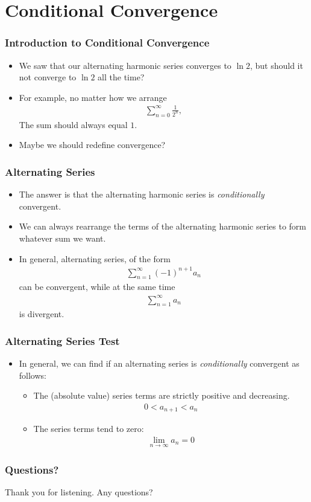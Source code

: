 \documentclass{beamer}
\begin{document}
\section{Conditional Convergence}
\begin{frame}
  \frametitle{Introduction to Conditional Convergence}
  \begin{itemize}
    \item<1-> We saw that our alternating harmonic series converges to $\ln 2$, but should it not converge to $\ln 2$ all the time?
    \item<2-> For example, no matter how we arrange
      \begin{align*}
        \sum_{n=0}^{\infty}\frac{1}{2^n},
      \end{align*}
      The sum should always equal $1$.
    \item<3-> Maybe we should redefine convergence?
  \end{itemize}
\end{frame}
\begin{frame}
  \frametitle{Alternating Series}
  \begin{itemize}
    \item<1-> The answer is that the alternating harmonic series is \textit{conditionally} convergent.
    \item<2-> We can always rearrange the terms of the alternating harmonic series to form whatever sum we want.
    \item<3-> In general, alternating series, of the form
      \begin{align*}
        \sum_{n=1}^{\infty}(-1)^{n+1}a_n
      \end{align*}
      can be convergent, while at the same time
      \begin{align*}
        \sum_{n=1}^{\infty} a_n
      \end{align*}
      is divergent.
  \end{itemize}
\end{frame}
\begin{frame}
  \frametitle{Alternating Series Test}
  \begin{itemize}
    \item<1-> In general, we can find if an alternating series is \textit{conditionally} convergent as follows:
    \begin{itemize}
      \item<2-> The (absolute value) series terms are strictly positive and decreasing.
        \begin{align*}
          0 < a_{n+1} < a_n
        \end{align*}
      \item<3-> The series terms tend to zero:
        \begin{align*}
          \lim_{n\rightarrow\infty}a_n = 0
        \end{align*}
    \end{itemize}
  \end{itemize}
\end{frame}
\begin{frame}
  \frametitle{Questions?}
  Thank you for listening. Any questions?
\end{frame}
\end{document}
